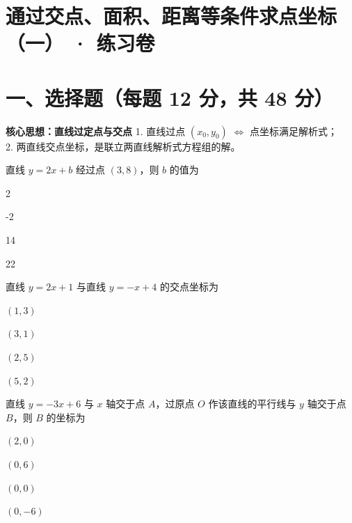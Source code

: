 \documentclass{exam-zh}
\begin{document}
\section*{通过交点、面积、距离等条件求点坐标（一） · 练习卷}

\section*{一、选择题（每题 12 分，共 48 分）}


\begin{keyideabox}
  \textbf{核心思想：直线过定点与交点}
  1. 直线过点 $(x_0, y_0)$ $\Leftrightarrow$ 点坐标满足解析式；\\ 2. 两直线交点坐标，是联立两直线解析式方程组的解。
\end{keyideabox}



\begin{question}[points=12]
  直线 $y = 2x + b$ 经过点 $(3, 8)$，则 $b$ 的值为
  \begin{choices}
    \item 2
    \item -2
    \item 14
    \item 22
  \end{choices}
\end{question}



\begin{question}[points=12]
  直线 $y = 2x + 1$ 与直线 $y = -x + 4$ 的交点坐标为
  \begin{choices}
    \item $(1, 3)$
    \item $(3, 1)$
    \item $(2, 5)$
    \item $(5, 2)$
  \end{choices}
\end{question}



\begin{question}[points=12]
  直线 $y = -3x + 6$ 与 $x$ 轴交于点 $A$，过原点 $O$ 作该直线的平行线与 $y$ 轴交于点 $B$，则 $B$ 的坐标为
  \begin{choices}
    \item $(2, 0)$
    \item $(0, 6)$
    \item $(0, 0)$
    \item $(0, -6)$
  \end{choices}
\end{question}
\end{document}
